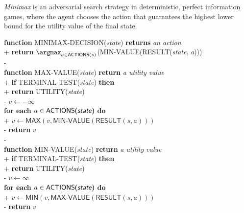 \documentclass{article}
\begin{document}
\begin{definition}
    \emph{Minimax} is an adversarial search strategy in deterministic, perfect
    information games, where the agent chooses the action that guarantees the
    highest lower bound for the utility value of the final state.

    \begin{pseudo}
        \textbf{function} MINIMAX-DECISION(\emph{state}) \textbf{returns} \emph{an action}\\+
            \textbf{return} $\argmax_{a\in\textsf{ACTIONS}(s)}$(MIN-VALUE(RESULT(\emph{state}, \emph{a})))\\-
        \\
        \textbf{function} MAX-VALUE(\emph{state}) \textbf{return} \emph{a utility value}\\+
            \textbf{if} TERMINAL-TEST(\emph{state}) \textbf{then}\\+
                \textbf{return} UTILITY(\emph{state})\\-
            $v\leftarrow-\infty$\\
            \textbf{for each} $a\in\textsf{ACTIONS(\emph{state})}$ \textbf{do}\\+
                $v\leftarrow \textsf{MAX}(v, \textsf{MIN-VALUE}(\textsf{RESULT}(s, a)))$\\-
            \textbf{return} $v$\\-
        \\
        \textbf{function} MIN-VALUE(\emph{state}) \textbf{return} \emph{a utility value}\\+
            \textbf{if} TERMINAL-TEST(\emph{state}) \textbf{then}\\+
                \textbf{return} UTILITY(\emph{state})\\-
            $v\leftarrow\infty$\\
            \textbf{for each} $a\in\textsf{ACTIONS(\emph{state})}$ \textbf{do}\\+
                $v\leftarrow \textsf{MIN}(v, \textsf{MAX-VALUE}(\textsf{RESULT}(s, a)))$\\-
            \textbf{return} $v$
    \end{pseudo}
\end{definition}
\end{document}
